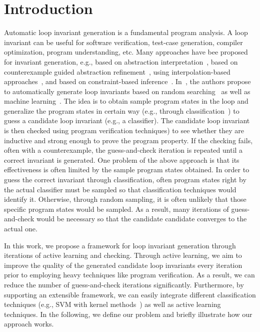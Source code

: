 
\section{Introduction} %
\label{sec:introduction}
Automatic loop invariant generation is a fundamental program analysis. A loop invariant can be useful for software verification, test-case generation, compiler optimization, program understanding, etc.
Many approaches have bee proposed for invariant generation, e.g., based on abstraction interpretation~\cite{cite}, based on counterexample guided abstraction refinement~\cite{cite}, using interpolation-based approaches~\cite{cite}, and based on constraint-based inference~\cite{cite}. In~\cite{sharma2012interpolants,DBLP:conf/sas/0001GHAN13,sharma2014invariant}, the authors propose to automatically generate loop invariants based on random searching~\cite{sharma2014invariant} as well as machine learning~\cite{sharma2012interpolants}. The idea is to obtain sample program states in the loop and generalize the program states in certain way (e.g., through classification~\cite{sharma2012interpolants,DBLP:conf/sas/0001GHAN13}) to guess a candidate loop invariant (e.g., a classifier). The candidate loop invariant is then checked using program verification techniques) to see whether they are inductive and strong enough to prove the program property. If the checking fails, often with a counterexample, the guess-and-check iteration is repeated until a correct invariant is generated. One problem of the above approach is that its effectiveness is often limited by the sample program states obtained. In order to guess the correct invariant through classification, often program states right by the actual classifier must be sampled so that classification techniques would identify it. Otherwise, through random sampling, it is often unlikely that those specific program states would be sampled. As a result, many iterations of guess-and-check would be necessary so that the candidate candidate converges to the actual one.

In this work, we propose a framework for loop invariant generation through iterations of active learning and checking. Through active learning, we aim to improve the quality of the generated candidate loop invariants every iteration prior to employing heavy techniques like program verification. As a result, we can reduce the number of guess-and-check iterations significantly. Furthermore, by supporting an extensible framework, we can easily integrate different classification techniques (e.g., SVM with kernel methods~\cite{}) as well as active learning techniques. %
In the following, we define our problem and briefly illustrate how our approach works. 


